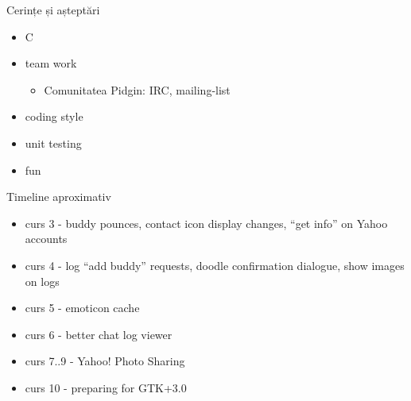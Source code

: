 \documentclass{beamer}
\begin{document}
\begin{frame}{Cerințe și așteptări}
  \begin{itemize}
    \item C
    \item team work
      \begin{itemize}
	\item Comunitatea Pidgin: IRC, mailing-list
      \end{itemize}
    \item coding style
    \item unit testing
    \item fun
  \end{itemize}
\end{frame}

\begin{frame}{Timeline aproximativ}
  \begin{itemize}[<+->]
    \item curs 3 - buddy pounces, contact icon display changes, ``get info''
      on Yahoo accounts
    \item curs 4 - log ``add buddy'' requests, doodle confirmation dialogue,
      show images on logs
    \item curs 5 - emoticon cache
    \item curs 6 - better chat log viewer
    \item curs 7..9 - Yahoo! Photo Sharing
    \item curs 10 - preparing for GTK+3.0
  \end{itemize}
\end{frame}
\end{document}

